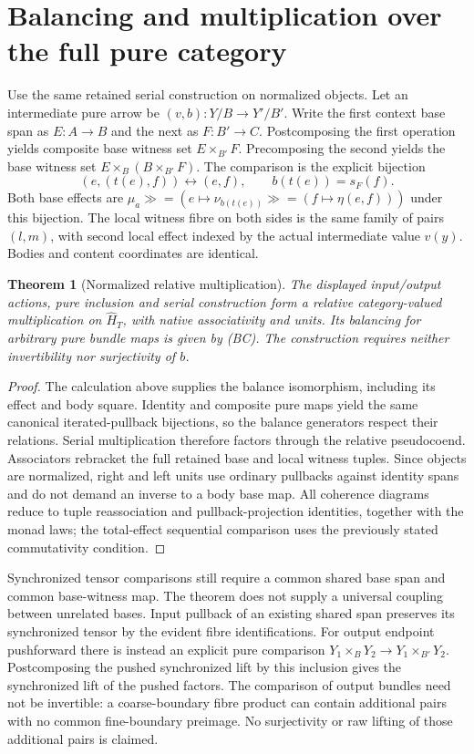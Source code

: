 \documentclass[11pt]{article}
\newtheorem{theorem}{Theorem}\newtheorem{proposition}{Proposition}\newtheorem{definition}{Definition}
\begin{document}
\section{Balancing and multiplication over the full pure category}
Use the same retained serial construction on normalized objects. Let an intermediate pure arrow be $(v,b):Y/B\to Y'/B'$. Write the first context base span as $E:A\to B$ and the next as $F:B'\to C$. Postcomposing the first operation yields composite base witness set $E\times_{B'}F$. Precomposing the second yields the base witness set $E\times_B(B\times_{B'}F)$. The comparison is the explicit bijection
\[
 (e,(t(e),f))\longleftrightarrow(e,f),
 \qquad b(t(e))=s_F(f).
\tag{BC}
\]
Both base effects are $\mu_a\gg=(e\mapsto\nu_{b(t(e))}\gg=(f\mapsto\eta(e,f)))$ under this bijection. The local witness fibre on both sides is the same family of pairs $(l,m)$, with second local effect indexed by the actual intermediate value $v(y)$. Bodies and content coordinates are identical.

\begin{theorem}[Normalized relative multiplication]
The displayed input/output actions, pure inclusion and serial construction form a relative category-valued multiplication on $\widehat H_T$, with native associativity and units. Its balancing for arbitrary pure bundle maps is given by (BC). The construction requires neither invertibility nor surjectivity of $b$.
\end{theorem}
\begin{proof}
The calculation above supplies the balance isomorphism, including its effect and body square. Identity and composite pure maps yield the same canonical iterated-pullback bijections, so the balance generators respect their relations. Serial multiplication therefore factors through the relative pseudocoend. Associators rebracket the full retained base and local witness tuples. Since objects are normalized, right and left units use ordinary pullbacks against identity spans and do not demand an inverse to a body base map. All coherence diagrams reduce to tuple reassociation and pullback-projection identities, together with the monad laws; the total-effect sequential comparison uses the previously stated commutativity condition.
\end{proof}

Synchronized tensor comparisons still require a common shared base span and common base-witness map. The theorem does not supply a universal coupling between unrelated bases. Input pullback of an existing shared span preserves its synchronized tensor by the evident fibre identifications. For output endpoint pushforward there is instead an explicit pure comparison $Y_1\times_B Y_2\to Y_1\times_{B'}Y_2$. Postcomposing the pushed synchronized lift by this inclusion gives the synchronized lift of the pushed factors. The comparison of output bundles need not be invertible: a coarse-boundary fibre product can contain additional pairs with no common fine-boundary preimage. No surjectivity or raw lifting of those additional pairs is claimed.
\end{document}

